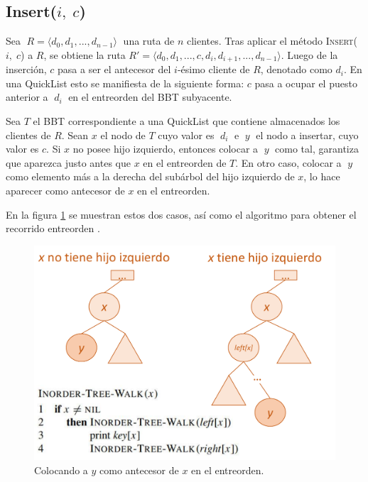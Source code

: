 \documentclass[a4paper,10pt,twocolumn]{article}
\begin{document}
\subsection{Insert($ i,\; c $)}\label{subsec:qlInsert}
  Sea $\; R = \langle d_0, d_1, ..., d_{n - 1} \rangle \;$ una ruta de $ n $ clientes. 
  Tras aplicar el método \textsc{Insert}($ i,\; c $) a $ R $, se obtiene la ruta
  $ R' = \langle d_0, d_1, ..., c, d_i, d_{i + 1}, ..., d_{n - 1} \rangle $. Luego de la
  inserción, $ c $ pasa a ser el antecesor del $ i $-ésimo cliente de $ R $, denotado
  como $ d_i $. En una QuickList esto se manifiesta de la siguiente forma: $ c $ pasa a ocupar 
  el puesto anterior a $\; d_i \;$ en el entreorden del BBT subyacente.
  
  Sea $ T $ el BBT correspondiente a una QuickList que contiene almacenados los clientes
  de $ R $. Sean $ x $ el nodo de $ T $ cuyo valor es $\; d_i \;$ e $\; y \;$ el nodo a 
  insertar, cuyo valor es $ c $. Si $ x $ no posee hijo izquierdo, entonces colocar a 
  $\; y \;$ como tal, garantiza que aparezca justo antes que $ x $ en el entreorden de $ T $.
  En otro caso, colocar a $\; y \;$ como elemento más a la derecha del subárbol del hijo 
  izquierdo de $ x $, lo hace aparecer como antecesor de $ x $ en el entreorden.
  
  En la figura \ref{fig:BBT_inserting} se muestran estos dos casos, así como el algoritmo para
  obtener el recorrido entreorden \cite[pág. 255]{MIT2}.
  
  \begin{figure}[htb]
  	\centering
  	\includegraphics[scale=.45]{Graphics/BBT_inserting.pdf}
  	\caption{Colocando a $ y $ como antecesor de $ x $ en el entreorden.} \label{fig:BBT_inserting}
  \end{figure}
\end{document}
